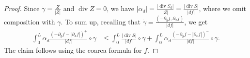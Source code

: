 \documentclass[10pt,a4paper]{amsart}
\newcommand{\de}{\partial}
\DeclareMathOperator{\dive}{div}
\begin{document}
\begin{proof}
	Since $\dot\gamma=\frac{Z}{|Z|}$ and $\dive Z=0$, we have $|\dot\alpha_d|=\frac{\lvert \dive S_d\rvert}{|Z|}=\frac{\lvert \dive S\rvert}{|df|}$, where we omit composition with $\gamma$. To sum up, recalling that $\dot\gamma=\frac{(-\de_y f,\de_x f)}{|df|}$, we get
	\begin{align*}
		\int_0^L\alpha_d\frac{(-\de_y f-|\de_x f|)^+}{|df|}\circ\gamma
		&\le\int_0^L\frac{\lvert \dive S\rvert}{|df|}\circ\gamma
		+\int_0^L\alpha_d\frac{(-\de_y f-|\de_x f|)^-}{|df|}\circ\gamma.
	\end{align*}
	The claim follows using the coarea formula for $f$.
\end{proof}
\end{document}

